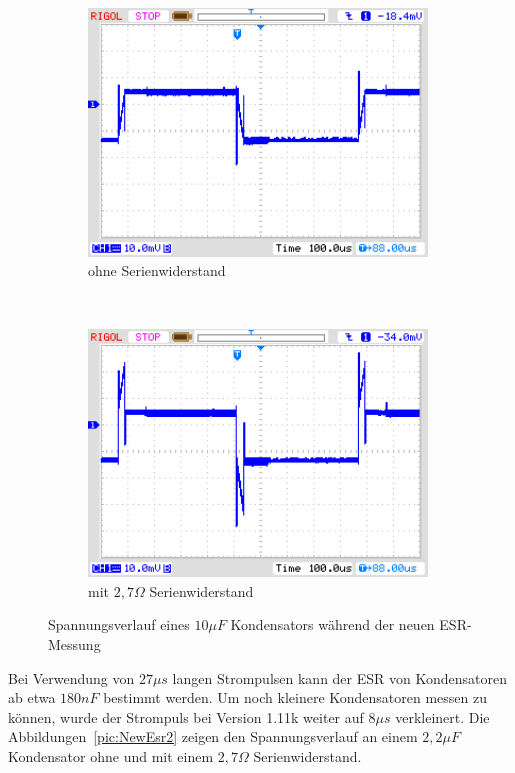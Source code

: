 \begin{figure}[H]
  \begin{subfigure}[b]{9cm}
    \centering
    \includegraphics[width=9cm]{../PNG/NewEsr10uF0R0.png}
    \caption{ohne Serienwiderstand}
  \end{subfigure}
  ~
  \begin{subfigure}[b]{9cm}
    \centering
    \includegraphics[width=9cm]{../PNG/NewEsr10uF2R7.png}
    \caption{mit \(2,7\Omega\) Serienwiderstand}
  \end{subfigure}
  \caption{Spannungsverlauf eines \(10\mu F\) Kondensators während der neuen ESR-Messung}
  \label{pic:NewEsr10}
\end{figure}

Bei Verwendung von \(27\mu s\) langen Strompulsen kann der ESR von Kondensatoren ab etwa \(180nF\) bestimmt werden.
Um noch kleinere Kondensatoren messen zu können, wurde der Strompuls bei Version 1.11k weiter auf \(8\mu s\) verkleinert.
Die Abbildungen~\ref{pic:NewEsr2} zeigen den Spannungsverlauf an einem \(2,2\mu F\) Kondensator ohne und mit
einem \(2,7\Omega\) Serienwiderstand.

